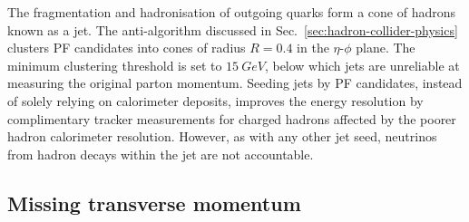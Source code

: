 The fragmentation and hadronisation of outgoing quarks form a cone of hadrons known as a jet. The anti-\kt algorithm \cite{Cacciari:2008gp,Cacciari:2011ma} discussed in Sec.~\ref{sec:hadron-collider-physics} clusters PF candidates into cones of radius $R=0.4$ in the $\eta$-$\phi$ plane.  The minimum clustering threshold is set to $\SI{15}{GeV}$, below which jets are unreliable at measuring the original parton momentum. Seeding jets by PF candidates, instead of solely relying on calorimeter deposits, improves the energy resolution by complimentary tracker measurements for charged hadrons affected by the poorer hadron calorimeter resolution. However, as with any other jet seed, neutrinos from hadron decays within  the jet are not accountable.


\subsection{Missing transverse momentum}

